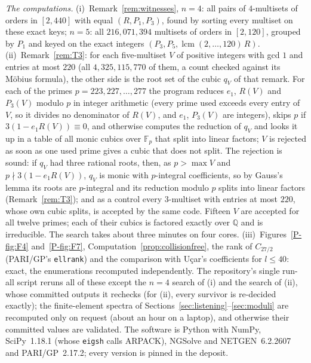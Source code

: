 \documentclass[pdflatex,sn-mathphys-num]{sn-jnl}
\newcommand{\Q}{\mathbb{Q}}
\newcommand{\pref}[1]{\ref*{P-#1}}%
\theoremstyle{thmstyleone}%
\theoremstyle{thmstylethree}%
\providecommand{\Q}{\mathbb{Q}}
\begin{document}
\emph{The computations.} (i)~Remark~\ref{rem:witnesses}, $n=4$: all pairs of $4$-multisets of orders in $[2,440]$ with equal $(R,P_1,P_3)$, found by sorting every multiset on these exact keys; $n=5$: all $216{,}071{,}394$ multisets of orders in $[2,120]$, grouped by $P_1$ and keyed on the exact integers $(P_3,P_5,\operatorname{lcm}(2,\dots,120)\,R)$. (ii)~Remark~\ref{rem:T3}: for each five-multiset $V$ of positive integers with gcd $1$ and entries at most $220$ (all $4{,}325{,}115{,}770$ of them, a count checked against its M\"obius formula), the other side is the root set of the cubic $q_V$ of that remark. For each of the primes $p=223,227,\dots,277$ the program reduces $e_1$, $R(V)$ and $P_3(V)$ modulo $p$ in integer arithmetic (every prime used exceeds every entry of $V$, so it divides no denominator of $R(V)$, and $e_1$, $P_3(V)$ are integers), skips $p$ if $3(1-e_1R(V))\equiv0$, and otherwise computes the reduction of $q_V$ and looks it up in a table of all monic cubics over $\mathbb F_p$ that split into linear factors; $V$ is rejected as soon as one used prime gives a cubic that does not split. The rejection is sound: if $q_V$ had three rational roots, then, as $p>\max V$ and $p\nmid3(1-e_1R(V))$, $q_V$ is monic with $p$-integral coefficients, so by Gauss's lemma its roots are $p$-integral and its reduction modulo $p$ splits into linear factors (Remark~\ref{rem:T3}); and as a control every $3$-multiset with entries at most $220$, whose own cubic splits, is accepted by the same code. Fifteen $V$ are accepted for all twelve primes; each of their cubics is factored exactly over $\Q$ and is irreducible. The search takes about three minutes on four cores. (iii)~Figures~\pref{fig:F4} and~\pref{fig:F7}, Computation~\ref{prop:collisionfree}, the rank of $C_{27/2}$ (PARI/GP's \texttt{ellrank}) and the comparison with U\c{c}ar's coefficients for $l\le40$: exact, the enumerations recomputed independently. The repository's single run-all script reruns all of these except the $n=4$ search of (i) and the search of (ii), whose committed outputs it rechecks (for (ii), every survivor is re-decided exactly); the finite-element spectra of Sections~\ref{sec:listening}--\ref{sec:moduli} are recomputed only on request (about an hour on a laptop), and otherwise their committed values are validated. The software is Python with NumPy, SciPy~1.18.1 (whose \texttt{eigsh} calls ARPACK), NGSolve and NETGEN~6.2.2607 and PARI/GP~2.17.2; every version is pinned in the deposit.
\end{document}
